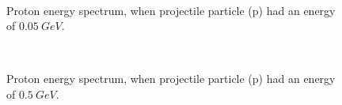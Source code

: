 \begin{figure}
  \begin{center}
    \leavevmode
    \mbox{\epsfxsize=8cm  }
       \caption{Proton energy spectrum, when projectile particle (p) had an energy of $0.05~GeV$.}
  \label{p50MeVPbProtonEnergy}
  \end{center}
\end{figure}


\begin{figure}
  \begin{center}
    \leavevmode
    \mbox{\epsfxsize=8cm  }
       \caption{Proton energy spectrum, when projectile particle (p) had an energy of $0.5~GeV$.}
  \label{p500MeVPbProtonEnergy}
  \end{center}
\end{figure}




 

